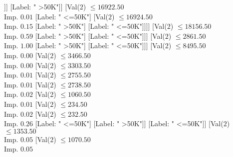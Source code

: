 \documentclass[margin=10pt]{standalone}
\begin{document}
\begin{forest}[Val($7$) $ \leq 2.50$ \\ Imp. $0.09$
	[Val($7$) $ \leq 0.50$ \\ Imp. $0.10$
		[Val($10$) $ \leq 22.50$ \\ Imp. $0.03$
			[Val($0$) $ \leq 29.50$ \\ Imp. $0.02$
				[Val($0$) $ \leq 24.50$ \\ Imp. $0.01$
					[Val($11$) $ \leq 59.50$ \\ Imp. $0.00$
						[Val($2$) $ \leq 18113.50$ \\ Imp. $0.00$
							[Val($2$) $ \leq 6775.50$ \\ Imp. $0.00$
								[Val($2$) $ \leq 6763.50$ \\ Imp. $0.01$
									[Val($2$) $ \leq 1664.50$ \\ Imp. $0.00$
										[Label: " <=50K"]
										[Val($2$) $ \leq 1673.50$ \\ Imp. $0.02$
											[Label: " >50K"]
											[Label: " <=50K"]]]
									[Label: " >50K"]]
								[Val($2$) $ \leq 16922.50$ \\ Imp. $0.01$
									[Label: " <=50K"]
									[Val($2$) $ \leq 16924.50$ \\ Imp. $0.15$
										[Label: " >50K"]
										[Label: " <=50K"]]]]
							[Val($2$) $ \leq 18156.50$ \\ Imp. $0.59$
								[Label: " >50K"]
								[Label: " <=50K"]]]
						[Val($2$) $ \leq 2861.50$ \\ Imp. $1.00$
							[Label: " >50K"]
							[Label: " <=50K"]]]
					[Val($2$) $ \leq 8495.50$ \\ Imp. $0.00$
						[Val($2$) $ \leq 3466.50$ \\ Imp. $0.00$
							[Val($2$) $ \leq 3303.50$ \\ Imp. $0.01$
								[Val($2$) $ \leq 2755.50$ \\ Imp. $0.01$
									[Val($2$) $ \leq 2738.50$ \\ Imp. $0.02$
										[Val($2$) $ \leq 1060.50$ \\ Imp. $0.01$
											[Val($2$) $ \leq 234.50$ \\ Imp. $0.02$
												[Val($2$) $ \leq 232.50$ \\ Imp. $0.26$
													[Label: " <=50K"]
													[Label: " >50K"]]
												[Label: " <=50K"]]
											[Val($2$) $ \leq 1353.50$ \\ Imp. $0.05$
												[Val($2$) $ \leq 1070.50$ \\ Imp. $0.05$

\end{forest}
\end{document}
